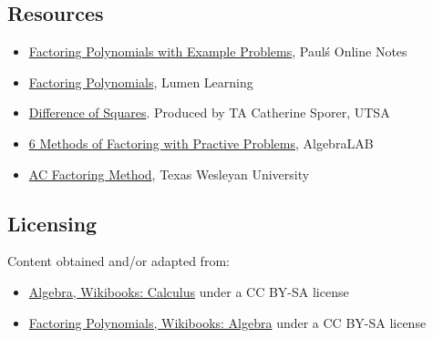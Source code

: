 \subsection{Resources}
\label{sss:reso-55b5}




\begin{itemize}
    \item \href{https://tutorial.math.lamar.edu/classes/alg/factoring.aspx}{Factoring Polynomials with Example Problems}, Paul\'s Online Notes
    \item \href{https://courses.lumenlearning.com/suny-beginalgebra/chapter/5-2-1-factor-trinomials/}{Factoring Polynomials}, Lumen Learning
    \item \href{https://www.youtube.com/watch?v=shHS-ERFVrc}{Difference of Squares}. Produced by TA Catherine Sporer, UTSA
    \item \href{http://www.algebralab.org/lessons/lesson.aspx?file=algebra_factoring.xml}{6 Methods of Factoring with Practive Problems}, AlgebraLAB
    \item \href{https://txwes.edu/media/twu/content-assets/images/academics/academic-success-center/A-C-Method.pdf}{AC Factoring Method}, Texas Wesleyan University
\end{itemize}


\subsection{Licensing}
\label{sss:lice-73524}




Content obtained and/or adapted from:



\begin{itemize}
    \item \href{https://en.wikibooks.org/wiki/Calculus/Algebra}{Algebra, Wikibooks: Calculus} under a CC BY-SA license
    \item \href{https://en.wikibooks.org/wiki/Algebra/Factoring_Polynomials}{Factoring Polynomials, Wikibooks: Algebra} under a CC BY-SA license
\end{itemize}


